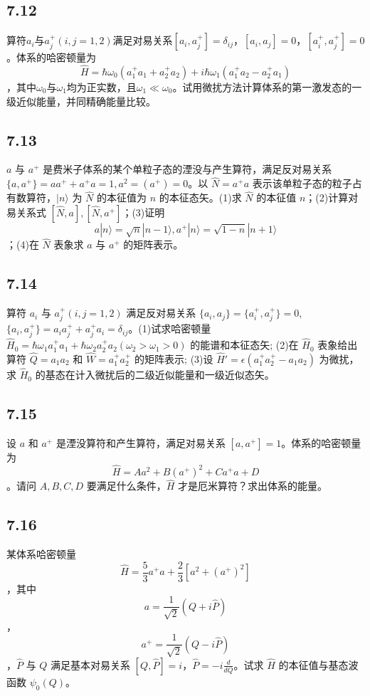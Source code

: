 \subsection{7.12}
算符$a_i$与$a_j^+(i,j=1,2)$满足对易关系$[a_i,a_j^+]=\delta_{ij}$，$[a_i,a_j]=0$，$[a_i^+,a_j^+]=0$。体系的哈密顿量为 $$\hat{H}=\hbar\omega_0(a_1^+a_1+a_2^+a_2)+i\hbar\omega_1(a_1^+a_2-a_2^+a_1)$$，其中$\omega_0$与$\omega_1$均为正实数，且$\omega_1 \ll \omega_0$。试用微扰方法计算体系的第一激发态的一级近似能量，并同精确能量比较。

\subsection{7.13}
$a$ 与 $a^+$ 是费米子体系的某个单粒子态的湮没与产生算符，满足反对易关系 $\{a, a^+\} = aa^+ + a^+ a = 1,  a^2 = (a^+) = 0$。以 $\hat{N} = a^+ a$ 表示该单粒子态的粒子占有数算符，$|n\rangle$ 为 $\hat{N}$ 的本征值为 $n$ 的本征态矢。(1)求 $\hat{N}$ 的本征值 $n$；(2)计算对易关系式 $[\hat{N}, a], [\hat{N}, a^+]$；(3)证明 $$a |n\rangle = \sqrt{n}|n-1\rangle,  a^+ |n\rangle = \sqrt{1-n}|n+1\rangle$$；(4)在 $\hat{N}$ 表象求 $a$ 与 $a^+$ 的矩阵表示。

\subsection{7.14}
算符 $a_i$ 与 $a_j^+(i,j=1,2)$ 满足反对易关系 $\{a_i,a_j\}=\{a_i^+,a_j^+\}=0$, $\{a_i,a_j^+\}=a_i a_j^++a_j^+ a_i=\delta_{ij}$。(1)试求哈密顿量 $\hat{H}_0 = \hbar \omega_1 a_1^+ a_1 + \hbar \omega_2 a_2^+ a_2 (\omega_2 > \omega_1 > 0)$ 的能谱和本征态矢; (2)在 $\hat{H}_0$ 表象给出算符 $\hat{Q} = a_1 a_2$ 和 $\hat{W} = a_1^+ a_2^+$ 的矩阵表示; (3)设 $\hat{H}' = \epsilon(a_1^+ a_2^+ - a_1 a_2)$ 为微扰，求 $\hat{H}_0$ 的基态在计入微扰后的二级近似能量和一级近似态矢。

\subsection{7.15}
设 $a$ 和 $a^+$ 是湮没算符和产生算符，满足对易关系 $[a, a^+] = 1$。体系的哈密顿量为 $$\hat{H} = A a^2 + B (a^+) ^2 + C a^+ a + D$$。请问 $A, B, C, D$ 要满足什么条件，$\hat{H}$ 才是厄米算符？求出体系的能量。

\subsection{7.16}
某体系哈密顿量 $$\hat{H} = \frac{5}{3} a^+ a + \frac{2}{3} [a^2 + (a^+)^2]$$，其中 $$a = \frac{1}{\sqrt{2}} (Q + i \hat{P})$$，$$a^+ = \frac{1}{\sqrt{2}} (Q - i \hat{P})$$，$\hat{P}$ 与 $Q$ 满足基本对易关系 $[Q, \hat{P}] = i$，$\hat{P} = -i \frac{d}{dQ}$。试求 $\hat{H}$ 的本征值与基态波函数 $\psi_0(Q)$。

